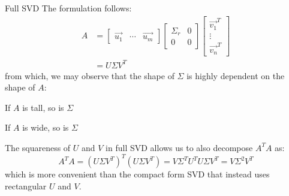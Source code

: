 \begin{ln-symbol}{Full SVD}{}
    The formulation follows:
    \begin{align*}
        A &=
        \begin{bmatrix} \vec{u_1} & \cdots & \vec{u_m} \end{bmatrix}
        \begin{bmatrix}
            \Sigma_r & 0 \\
            0 & 0
        \end{bmatrix}
        \begin{bmatrix} \vec{v_1}^T \\ \vdots \\ \vec{v_n}^T \end{bmatrix} \\
        &= U \Sigma V^T
    \end{align*}
    from which, we may observe that the shape of $\Sigma$ is highly dependent on the shape of $A$:
    \begin{bindenum}
        \item If $A$ is tall, so is $\Sigma$
        \item If $A$ is wide, so is $\Sigma$
    \end{bindenum}
\end{ln-symbol}
The squareness of $U$ and $V$ in full SVD allows us to also decompose $A^T A$ as:
\[
    A^T A = {(U \Sigma V^T)}^T (U \Sigma V^T) = V \Sigma^T U^T U \Sigma V^T = V \Sigma^2 V^T
\]
which is more convenient than the compact form SVD that instead uses rectangular $U$ and $V$.

